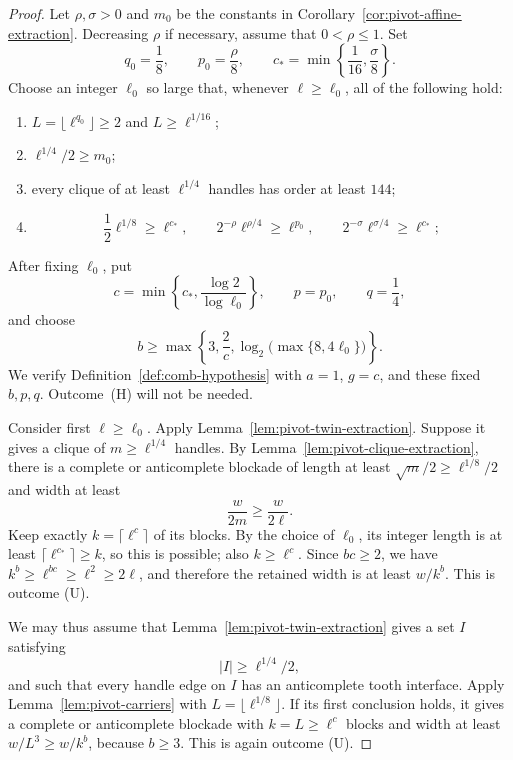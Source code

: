 \documentclass[11pt]{article}
\numberwithin{equation}{section}
\theoremstyle{plain}
\theoremstyle{definition}
\begin{document}
\begin{proof}
Let $\rho,\sigma>0$ and $m_0$ be the constants in
Corollary~\ref{cor:pivot-affine-extraction}.  Decreasing $\rho$ if
necessary, assume that $0<\rho\leq1$.  Set
\[
 q_0=\frac{1}{8},\qquad p_0=\frac{\rho}{8},\qquad
 c_*=\min\left\{\frac{1}{16},\frac{\sigma}{8}\right\}.
\]
Choose an integer $\ell_0$ so large that, whenever $\ell\geq\ell_0$,
all of the following hold:
\begin{enumerate}
 \item $L=\lfloor\ell^{q_0}\rfloor\geq2$ and
       $L\geq\ell^{1/16}$;
 \item $\ell^{1/4}/2\geq m_0$;
 \item every clique of at least $\ell^{1/4}$ handles has order at
       least $144$;
 \item
 \[
  \frac{1}{2}\ell^{1/8}\geq\ell^{c_*},\qquad
  2^{-\rho}\ell^{\rho/4}\geq\ell^{p_0},\qquad
  2^{-\sigma}\ell^{\sigma/4}\geq\ell^{c_*};
  \]
\end{enumerate}

After fixing $\ell_0$, put
\[
 c=\min\left\{c_*,\frac{\log 2}{\log\ell_0}\right\},
 \qquad p=p_0,\qquad q=\frac{1}{4},
\]
and choose
\begin{equation}
 b\geq\max\left\{3,\frac{2}{c},
          \log_2\bigl(\max\{8,4\ell_0\}\bigr)\right\}.
 \label{eq:comb-b-choice}
\end{equation}
We verify Definition~\ref{def:comb-hypothesis} with
$a=1$, $g=c$, and these fixed $b,p,q$.  Outcome~(H) will not be needed.

Consider first $\ell\geq\ell_0$.  Apply
Lemma~\ref{lem:pivot-twin-extraction}.  Suppose it gives a clique of
$m\geq\ell^{1/4}$ handles.  By
Lemma~\ref{lem:pivot-clique-extraction}, there is a complete or
anticomplete blockade of length at least
$\sqrt m/2\geq\ell^{1/8}/2$ and width at least
\[
                         \frac{w}{2m}\geq \frac{w}{2\ell}.
\]
Keep exactly $k=\lceil\ell^c\rceil$ of its blocks.  By the choice of
$\ell_0$, its integer length is at least
$\lceil\ell^{c_*}\rceil\geq k$, so this is possible; also
$k\geq\ell^c$.  Since
$b c\geq2$, we have $k^b\geq\ell^{bc}\geq\ell^2\geq2\ell$, and
therefore the retained width is at least $w/k^b$.  This is outcome (U).

We may thus assume that Lemma~\ref{lem:pivot-twin-extraction} gives a
set $I$ satisfying
\[
                         |I|\geq\ell^{1/4}/2,
\]
and such that every handle edge on $I$ has an anticomplete tooth
interface.  Apply Lemma~\ref{lem:pivot-carriers} with
$L=\lfloor\ell^{1/8}\rfloor$.  If its first conclusion holds, it
gives a complete or anticomplete blockade with $k=L\geq\ell^c$ blocks
and width at least $w/L^3\geq w/k^b$, because $b\geq3$.  This is again
outcome (U).


\end{proof}
\end{document}
